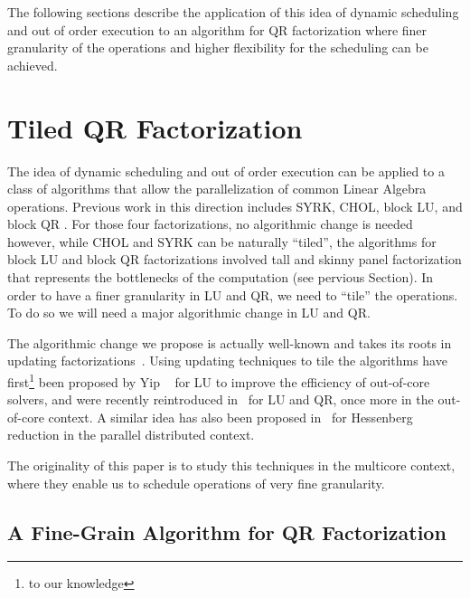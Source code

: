 \documentclass[runningheads]{llncs}
\begin{document}
The following sections describe the application of this  idea of
dynamic scheduling and out of order execution to an algorithm for QR
factorization where finer granularity of the operations and higher
flexibility for the scheduling can be achieved.

\section{Tiled QR Factorization}
\label{sec:tiled}

The idea of dynamic scheduling and out of order execution can be
applied to a class of algorithms that allow the parallelization of
common Linear Algebra operations.  Previous work in this direction
includes SYRK, CHOL, block LU, and block QR
\cite{Kurzak:2006:ILA,1248397,para06}. For those four
factorizations, no algorithmic change is needed however, while CHOL
and SYRK can be naturally ``tiled'', the algorithms for block LU and
block QR factorizations involved tall and skinny panel factorization
that represents the bottlenecks of the computation (see pervious
Section). In order to have a finer granularity in LU and QR, we need
to ``tile'' the operations. To do so we will need a major
algorithmic change in LU and QR.

The algorithmic change we propose is actually well-known and takes
its roots in updating factorizations~\cite{golubvanloan,stew:98}.
Using updating techniques to tile the algorithms have
first\footnote{to our knowledge} been proposed by Yip
~\cite{yip_ooc} for LU to improve the efficiency of out-of-core
solvers, and were recently reintroduced in~\cite{vdgooclu,1055534}
for LU and QR, once more in the out-of-core context. A similar idea
has also been proposed in~\cite{210517} for Hessenberg reduction in
the parallel distributed context.

The originality of this paper is to study this techniques in the multicore
context, where they enable us to schedule operations of very fine
granularity.


\subsection{A Fine-Grain Algorithm for QR Factorization}
\end{document}

